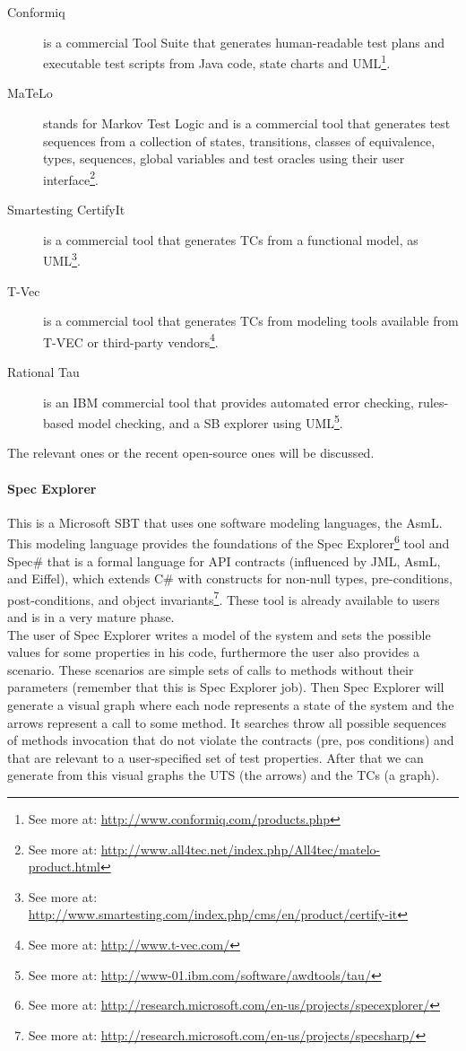 \begin{description}
\item[Conformiq] is a commercial Tool Suite that generates
human-readable test plans and executable test scripts from Java code, state charts and \ac{UML}\footnote{See more at: \url{http://www.conformiq.com/products.php}}.
\item[MaTeLo] stands for Markov Test Logic and is a commercial tool
that generates test sequences from a collection of states, transitions, classes of equivalence, types, sequences, global variables and test oracles
using their user interface\footnote{See more at: \url{http://www.all4tec.net/index.php/All4tec/matelo-product.html}}.
\item[Smartesting CertifyIt] is a commercial tool that generates \ac{TC}s from a functional model, as \ac{UML}\footnote{See more at: \url{http://www.smartesting.com/index.php/cms/en/product/certify-it}}.
\item[T-Vec] is a commercial tool that generates \ac{TC}s from modeling tools available from T-VEC or third-party vendors\footnote{See more at: \url{http://www.t-vec.com/}}.
\item[Rational Tau] is an \ac{IBM} commercial tool that provides automated error checking, rules-based model checking, and a \ac{SB} explorer using
\ac{UML}\footnote{See more at: \url{http://www-01.ibm.com/software/awdtools/tau/}}.
\end{description}

The relevant ones or the recent open-source ones will be discussed.
\paragraph{Spec Explorer}
This is a Microsoft \ac{SBT} that uses one software modeling languages, the \ac{AsmL}.
This modeling language provides the foundations of the Spec Explorer\footnote{See more at: \url{http://research.microsoft.com/en-us/projects/specexplorer/}} tool
and Spec\# that is a formal language for \ac{API} contracts (influenced by \ac{JML}, \ac{AsmL}, and Eiffel), which extends C\# with constructs for non-null types,
pre-conditions, post-conditions, and object invariants\footnote{See more at: \url{http://research.microsoft.com/en-us/projects/specsharp/}}.
These tool is already available to users and is in a very mature phase.\\
\indent The user of Spec Explorer writes a model of the system and sets the possible values for some properties in his code, furthermore the user also provides a scenario.
These scenarios are simple sets of calls to methods without their parameters (remember that this is Spec Explorer job).
Then Spec Explorer will generate a visual graph where each node represents a state of the system and the arrows represent a call to some method.
It searches throw all possible sequences of methods invocation that do not violate the contracts (pre, pos conditions) and
that are relevant to a user-specified set of test properties. After that we can generate from this visual graphs the \ac{UTS} (the arrows) and the
\ac{TC}s (a graph).

